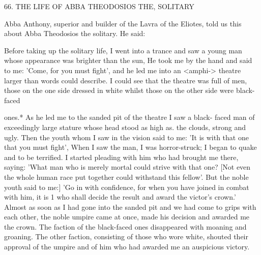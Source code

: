66.
THE LIFE OF ABBA THEODOSIOS THE, SOLITARY

Abba Anthony, superior and builder of the Lavra of the Eliotes,
told us this about Abba Theodosios the solitary.
He said:

Before taking up the solitary life, I went into a trance and saw a
young man whose appearance was brighter than the sun, He took
me by the hand and said to me: 'Come, for you must fight', and he
led me into an <amphi-> theatre larger than words could describe.
I could see that the theatre was full of men, those on the one side
dressed in white whilst those on the other side were black-faced

ones.* As he led me to the sanded pit of the theatre I saw a black-
faced man of exceedingly large stature whose head stood as high as.
the clouds, strong and ugly.
Then the youth whom I saw in the
vision said to me: 'It is with that one that you must fight', When I
saw the man, I was horror-struck; I began to quake and to be
terrified.
I started pleading with him who had brought me there,
saying: 'What man who is merely mortal could strive with that one?
[Not even the whole human race put together could withstand this
fellow'.
But the noble youth said to me:] 'Go in with confidence, for
when you have joined in combat with him, it is 1 who shall decide
the result and award the victor's crown.' Almost as soon as I had
gone into the sanded pit and we had come to grips with each other,
the noble umpire came at once, made his decision and awarded me
the crown.
The faction of the black-faced ones disappeared with
moaning and groaning.
The other faction, consisting of those who
wore white, shouted their approval of the umpire and of him who
had awarded me an auspicious victory.

